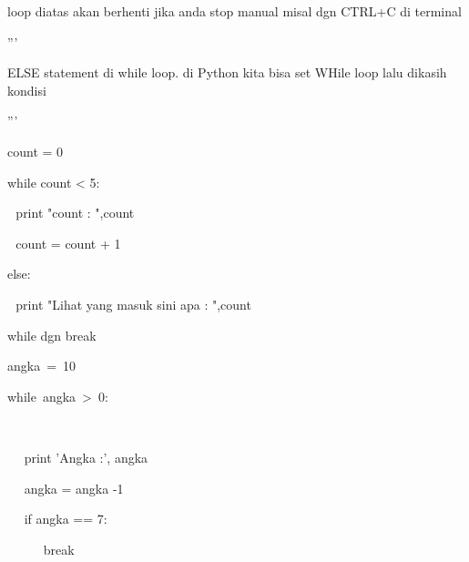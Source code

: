 loop diatas akan berhenti jika anda stop manual misal dgn CTRL+C di terminal \par
''' \par
ELSE statement di while loop. di Python kita bisa set WHile loop lalu dikasih kondisi \par
''' \par
count = 0 \par
while count < 5: \par
 $  $  $  $  $  $print "count : ",count \par
 $  $  $  $  $  $count = count + 1 \par
else: \par
 $  $  $  $ print "Lihat yang masuk sini apa : ",count \par
\vspace{12pt}
while dgn break \par
angka~=~10~~~~~~    \par
while~angka~>~0:~~~~~~~~~~     \par
~~  \par
~~ print 'Angka :', angka \par
~~ angka = angka -1 \par
~~ if angka == 7: \par
~~~~~ break \par
\vspace{\baselineskip}
\vspace{12pt}
\vspace{12pt}
